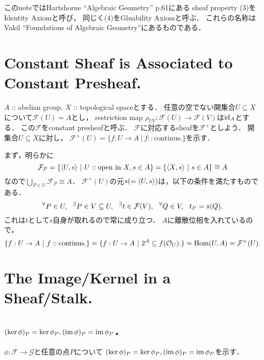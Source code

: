 \documentclass[a4paper]{jsarticle}
\newcommand{\shF}{\mathcal{F}}
\newcommand{\shG}{\mathcal{G}}
\begin{document}
    このnoteではHartshorne ``Algebraic Geometry'' p.61にある
    sheaf property (3)をIdentity Axiomと呼び，
    同じく(4)をGluability Axiomと呼ぶ．
    これらの名称はVakil ``Foundations of Algebraic Geometry''にあるものである．

\section{Constant Sheaf is Associated to Constant Presheaf.} %
    $A$ :: abelian group, $X$ :: topological spaceとする．
    任意の空でない開集合$U \subseteq X$について$\shF(U)=A$とし，
    restriction map $\rho_{UV}: \shF(U) \to \shF(V)$は$\mathrm{id}_{A}$とする．
    この$\shF$をconstant presheafと呼ぶ．
    $\shF$に対応するsheafを$\shF^+$としよう．
    開集合$U \subseteq X$に対し，
    $\shF^+(U)=\{ f:U \to A ~|~ f :: \text{continus}. \}$を示す．

    まず，明らかに
    \[ \shF_P=\{ \reg{U}{s} ~|~ U :: \text{open in }X, s \in A\}=\{ \reg{X}{s} ~|~ s \in A\} \cong A \]
    なので$\bigcup_{P \in U} \shF_P \cong A$．
    $\shF^+(U)$の元$s(=\langle U,s \rangle)$は，以下の条件を満たすものである．
    \[ \Forall{P \in U} \Exists{P \in V \subseteq U} \Exists{t \in \shF(V)} \Forall{Q \in V}  t_P=s(Q). \]
    これは$t$として$s$自身が取れるので常に成り立つ．
    $A$に離散位相を入れているので，
    \[ \{ f:U \to A ~|~ f :: \text{continus}. \}=\{ f:U \to A ~|~ 2^A \subseteq f(\mathcal{O}_U). \}=\Hom(U,A)=\shF^+(U). \]

\section{The Image/Kernel in a Sheaf/Stalk.} %
    \subsection{$(\ker \phi)_P=\ker \phi_P, (\operatorname{im} \phi)_P=\operatorname{im} \phi_P$．}
    $\phi: \shF \to \shG$と任意の点$P$について
    $(\ker \phi)_P=\ker \phi_P, (\operatorname{im} \phi)_P=\operatorname{im} \phi_P$を示す．
\end{document}
